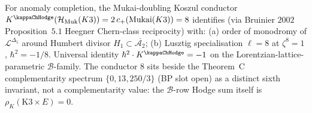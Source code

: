 \begin{remark}
\label{rem:ac-comparison-mukai-bruinier}
For anomaly completion, the Mukai-doubling Koszul conductor $K^{\kappaChHodge}(\mathcal{H}_{\mathrm{Muk}}(K3)) = 2\,c_+(\mathrm{Mukai}(K3)) = 8$ identifies (via Bruinier $2002$ Proposition~$5.1$ Heegner Chern-class reciprocity) with: (a) order of monodromy of $\mathcal{L}^{\Delta_5}$ around Humbert divisor $H_1 \subset \overline{\mathcal{A}_2}$; (b) Lusztig specialisation $\ell = 8$ at $\zeta^8 = 1$, $\hbar^2 = -1/8$. Universal identity $\hbar^2 \cdot K^{\kappaChHodge} = -1$ on the Lorentzian-lattice-parametric $\mathcal{B}$-family. The conductor $8$ sits beside the Theorem~C complementarity spectrum $\{0, 13, 250/3\}$ (BP slot open) as a distinct sixth invariant, not a complementarity value: the $\mathcal{B}$-row Hodge sum itself is $\rho_K(\mathrm{K3}\times E) = 0$.
\end{remark}
